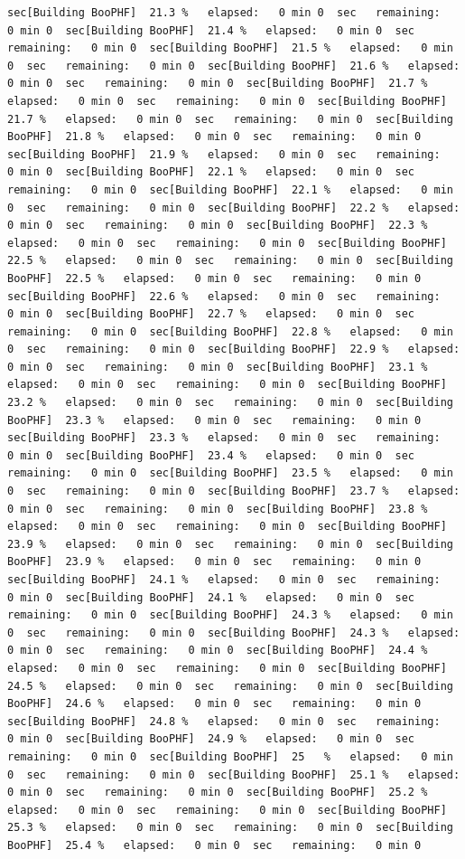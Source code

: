 \documentclass[
]{book}
\begin{document}
\begin{verbatim}
sec[Building BooPHF]  21.3 %   elapsed:   0 min 0  sec   remaining:   0 min 0  sec[Building BooPHF]  21.4 %   elapsed:   0 min 0  sec   remaining:   0 min 0  sec[Building BooPHF]  21.5 %   elapsed:   0 min 0  sec   remaining:   0 min 0  sec[Building BooPHF]  21.6 %   elapsed:   0 min 0  sec   remaining:   0 min 0  sec[Building BooPHF]  21.7 %   elapsed:   0 min 0  sec   remaining:   0 min 0  sec[Building BooPHF]  21.7 %   elapsed:   0 min 0  sec   remaining:   0 min 0  sec[Building BooPHF]  21.8 %   elapsed:   0 min 0  sec   remaining:   0 min 0  sec[Building BooPHF]  21.9 %   elapsed:   0 min 0  sec   remaining:   0 min 0  sec[Building BooPHF]  22.1 %   elapsed:   0 min 0  sec   remaining:   0 min 0  sec[Building BooPHF]  22.1 %   elapsed:   0 min 0  sec   remaining:   0 min 0  sec[Building BooPHF]  22.2 %   elapsed:   0 min 0  sec   remaining:   0 min 0  sec[Building BooPHF]  22.3 %   elapsed:   0 min 0  sec   remaining:   0 min 0  sec[Building BooPHF]  22.5 %   elapsed:   0 min 0  sec   remaining:   0 min 0  sec[Building BooPHF]  22.5 %   elapsed:   0 min 0  sec   remaining:   0 min 0  sec[Building BooPHF]  22.6 %   elapsed:   0 min 0  sec   remaining:   0 min 0  sec[Building BooPHF]  22.7 %   elapsed:   0 min 0  sec   remaining:   0 min 0  sec[Building BooPHF]  22.8 %   elapsed:   0 min 0  sec   remaining:   0 min 0  sec[Building BooPHF]  22.9 %   elapsed:   0 min 0  sec   remaining:   0 min 0  sec[Building BooPHF]  23.1 %   elapsed:   0 min 0  sec   remaining:   0 min 0  sec[Building BooPHF]  23.2 %   elapsed:   0 min 0  sec   remaining:   0 min 0  sec[Building BooPHF]  23.3 %   elapsed:   0 min 0  sec   remaining:   0 min 0  sec[Building BooPHF]  23.3 %   elapsed:   0 min 0  sec   remaining:   0 min 0  sec[Building BooPHF]  23.4 %   elapsed:   0 min 0  sec   remaining:   0 min 0  sec[Building BooPHF]  23.5 %   elapsed:   0 min 0  sec   remaining:   0 min 0  sec[Building BooPHF]  23.7 %   elapsed:   0 min 0  sec   remaining:   0 min 0  sec[Building BooPHF]  23.8 %   elapsed:   0 min 0  sec   remaining:   0 min 0  sec[Building BooPHF]  23.9 %   elapsed:   0 min 0  sec   remaining:   0 min 0  sec[Building BooPHF]  23.9 %   elapsed:   0 min 0  sec   remaining:   0 min 0  sec[Building BooPHF]  24.1 %   elapsed:   0 min 0  sec   remaining:   0 min 0  sec[Building BooPHF]  24.1 %   elapsed:   0 min 0  sec   remaining:   0 min 0  sec[Building BooPHF]  24.3 %   elapsed:   0 min 0  sec   remaining:   0 min 0  sec[Building BooPHF]  24.3 %   elapsed:   0 min 0  sec   remaining:   0 min 0  sec[Building BooPHF]  24.4 %   elapsed:   0 min 0  sec   remaining:   0 min 0  sec[Building BooPHF]  24.5 %   elapsed:   0 min 0  sec   remaining:   0 min 0  sec[Building BooPHF]  24.6 %   elapsed:   0 min 0  sec   remaining:   0 min 0  sec[Building BooPHF]  24.8 %   elapsed:   0 min 0  sec   remaining:   0 min 0  sec[Building BooPHF]  24.9 %   elapsed:   0 min 0  sec   remaining:   0 min 0  sec[Building BooPHF]  25   %   elapsed:   0 min 0  sec   remaining:   0 min 0  sec[Building BooPHF]  25.1 %   elapsed:   0 min 0  sec   remaining:   0 min 0  sec[Building BooPHF]  25.2 %   elapsed:   0 min 0  sec   remaining:   0 min 0  sec[Building BooPHF]  25.3 %   elapsed:   0 min 0  sec   remaining:   0 min 0  sec[Building BooPHF]  25.4 %   elapsed:   0 min 0  sec   remaining:   0 min 0  
\end{verbatim}
\end{document}
